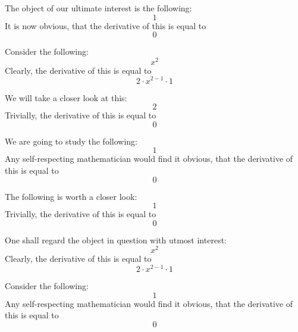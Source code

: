 \documentclass{article}
\begin{document}
The object of our ultimate interest is the following:
\begin{equation}
1 
\end{equation}
It is now obvious, that the derivative of this is equal to
\begin{equation}
0 
\end{equation}

Consider the following:
\begin{equation}
x ^{2 } 
\end{equation}
Clearly, the derivative of this is equal to
\begin{equation}
2 \cdot x ^{2 - 1 } \cdot 1 
\end{equation}

We will take a closer look at this:
\begin{equation}
2 
\end{equation}
Trivially, the derivative of this is equal to
\begin{equation}
0 
\end{equation}

We are going to study the following:
\begin{equation}
1 
\end{equation}
Any self-respecting mathematician would find it obvious, that the derivative of this is equal to
\begin{equation}
0 
\end{equation}

The following is worth a closer look:
\begin{equation}
1 
\end{equation}
Trivially, the derivative of this is equal to
\begin{equation}
0 
\end{equation}

One shall regard the object in question with utmost interest:
\begin{equation}
x ^{2 } 
\end{equation}
Clearly, the derivative of this is equal to
\begin{equation}
2 \cdot x ^{2 - 1 } \cdot 1 
\end{equation}

Consider the following:
\begin{equation}
1 
\end{equation}
Any self-respecting mathematician would find it obvious, that the derivative of this is equal to
\begin{equation}
0 
\end{equation}
\end{document}
